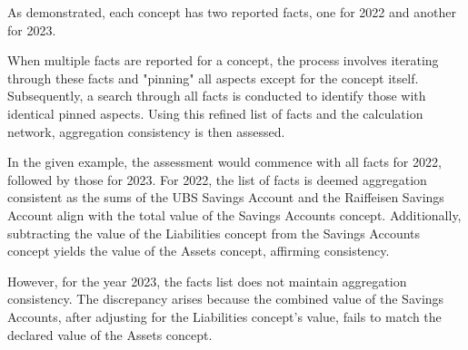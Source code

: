 



As demonstrated, each concept has two reported facts, one for 2022 and another for 2023.

When multiple facts are reported for a concept, the process involves iterating through these facts and "pinning" all aspects except for the concept itself.  
Subsequently, a search through all facts is conducted to identify those with identical pinned aspects.  
Using this refined list of facts and the calculation network, aggregation consistency is then assessed.

In the given example, the assessment would commence with all facts for 2022, followed by those for 2023.  
For 2022, the list of facts is deemed aggregation consistent as the sums of the UBS Savings Account and the Raiffeisen Savings Account align with the total value of the Savings Accounts concept.  
Additionally, subtracting the value of the Liabilities concept from the Savings Accounts concept yields the value of the Assets concept, affirming consistency.

However, for the year 2023, the facts list does not maintain aggregation consistency.  
The discrepancy arises because the combined value of the Savings Accounts, after adjusting for the Liabilities concept's value, fails to match the declared value of the Assets concept.

